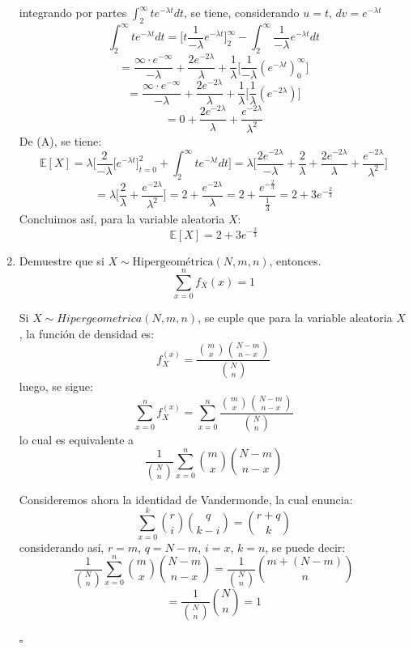 \documentclass[11pt,a4paper]{report}
\begin{document}
\begin{enumerate}
{			integrando por partes $\int_{2}^{\infty} t e^{-\lambda t} dt$, se
			tiene, considerando $u = t$, $dv = e^{-\lambda t} $
				$$ \int_{2}^{\infty} t e^{-\lambda t} dt
				=  \Big[ t \frac{1}{- \lambda} e^{-\lambda t} \Big]_{2}^{\infty}
					- \int_{2}^{\infty} \frac{1}{- \lambda} e^{-\lambda t} dt$$
				$$ = \frac{\infty \cdot e^{-\infty}}{-\lambda}
				   + \frac{2e^{-2\lambda}}{\lambda} + \frac{1}{\lambda}
				    \Big[ \frac{1}{- \lambda } (e^{-\lambda
					t})_{0}^{\infty}\Big]$$
				$$ = \frac{\infty \cdot e^{-\infty}}{-\lambda}
				   + \frac{2e^{-2\lambda}}{\lambda} + \frac{1}{\lambda}
				    \Big[ \frac{1}{\lambda } (e^{-2 \lambda})\Big]$$
				$$ = 0 + \frac{2e^{-2\lambda}}{\lambda}
				   + \frac{ e^{-2 \lambda} }{\lambda^2} $$
			De (A), se tiene:
				$$ \mathbb{E}[X] =\lambda \Big[
								 \frac{2}{-\lambda} \Big[ e^{-\lambda t}
								 \Big]_{t=0}^{2}
							  + \int_{2}^{\infty} t e^{-\lambda t} dt \Big]
					= \lambda \Big[ \frac{2e^{-2\lambda}}{-\lambda}
								  +	\frac{2}{\lambda}
								  + \frac{2e^{-2\lambda}}{\lambda}
								  + \frac{ e^{-2 \lambda} }{\lambda^2} \Big]$$
				$$ = \lambda \Big[ \frac{2}{\lambda}
							     + \frac{ e^{-2 \lambda} }{\lambda^2} \Big]
				   = 2 + \frac{ e^{-2 \lambda} }{\lambda}
				   = 2 + \frac{ e^{- \frac{2}{3}} }{\frac{1}{3}}
				   = 2 + 3e^{-\frac{2}{3}} $$
			Concluimos así, para la variable aleatoria $X$:
				$$ \mathbb{E}[X] = 2 + 3e^{-\frac{2}{3}} $$

		}

		\item{
			Demuestre que si $X \sim \text{Hipergeométrica}(N,m,n)$, entonces.
				$$ \sum_{x = 0}^{n}f_X(x) = 1$$

			Si $X \sim Hipergeometrica(N, m, n)$, se cuple que para la variable
			aleatoria $X$, la función de densidad es:
				$$ f_X^{(x)} = \frac{{m \choose x} {N-m \choose n-x} }
							   {{N \choose n}} $$
			luego, se sigue:
				$$ \sum_{x = 0}^{n} f_X^{(x)} = \sum_{x = 0}^{n}
				   \frac{{m \choose x} {N-m \choose n-x} } {{N \choose n}}$$
			lo cual es equivalente a
				$$ \frac{1}{{N \choose n}} \sum_{x = 0}^{n}
				   {m \choose x} {N-m \choose n-x}$$

			Consideremos ahora la identidad de Vandermonde, la cual enuncia:
				$$ \sum_{x = 0}^{k} {r \choose i} {q \choose k - i}
				   = {r + q \choose k}$$
			considerando así, $r = m$, $q = N-m$, $i = x$, $k = n$, se puede
			decir:
				$$ \frac{1}{{N \choose n}} \sum_{x = 0}^{n} {m \choose x}
				  {N-m \choose n-x} = \frac{1}{{N \choose n}}
				  {m + (N-m) \choose n} $$
				$$ = \frac{1}{{N \choose n}} {N \choose n} = 1 $$
									 						  \begin{flushright}
															  	$\square$
										         			  \end{flushright}
		}


\end{enumerate}
\end{document}
